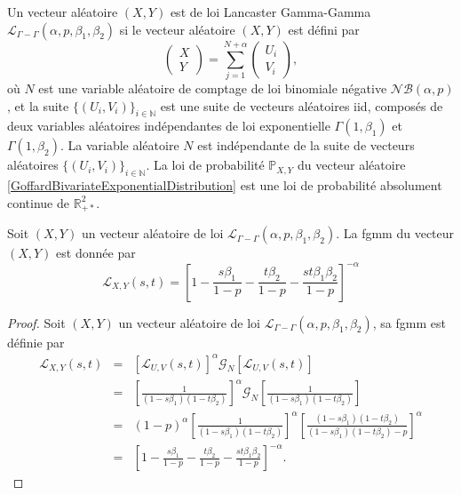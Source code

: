\begin{Def}\label{GoffardBivariateExponentialDistributionDef}
Un vecteur aléatoire $(X,Y)$ est de loi Lancaster Gamma-Gamma $\mathcal{L}_{\Gamma-\Gamma}(\alpha,p,\beta_{1},\beta_{2})$ si le vecteur aléatoire $(X,Y)$ est défini par
\begin{equation}\label{GoffardBivariateExponentialDistribution}
\left( \begin{array}{l}
X \\
Y\end{array}
\right)  =
 \displaystyle
\sum_{j=1}^{N+\alpha}
\left( \begin{array}{l}
U_{i} \\
V_{i}
\end{array}
\right),
\end{equation}
où $N$ est une variable aléatoire de comptage de loi binomiale négative $\mathcal{NB}(\alpha,p)$, et la suite $\{(U_{i},V_{i})\}_{i\in\mathbb{N}}$ est une suite de vecteurs aléatoires \gls{iid}, composés de deux variables aléatoires indépendantes de loi exponentielle $\Gamma(1,\beta_{1})$ et $\Gamma(1,\beta_{2})$. La variable aléatoire $N$ est indépendante de la suite de vecteurs aléatoires $\{(U_{i},V_{i})\}_{i\in\mathbb{N}}$. La loi de probabilité $\mathbb{P}_{X,Y}$ du vecteur aléatoire \eqref{GoffardBivariateExponentialDistribution} est une loi de probabilité absolument continue de $\mathbb{R}_{+*}^{2}$.
\end{Def}
\begin{Prop}\label{GoffardBivariateExponentialDistributionFgmmProp}
Soit $(X,Y)$ un vecteur aléatoire de loi $\mathcal{L}_{\Gamma-\Gamma}(\alpha,p,\beta_{1},\beta_{2})$. La \gls{fgmm} du vecteur $(X,Y)$ est donnée par 
\begin{equation}\label{GoffardBivariateExponentialDistributionFgmm}
\mathcal{L}_{X,Y}(s,t)=\left[1-\frac{s\beta_{1}}{1-p}-\frac{t\beta_{2}}{1-p}-\frac{st\beta_{1}\beta_{2}}{1-p}\right]^{-\alpha}
\end{equation}
\end{Prop}
\begin{proof}
Soit $(X,Y)$ un vecteur aléatoire de loi $\mathcal{L}_{\Gamma-\Gamma}(\alpha,p,\beta_{1},\beta_{2})$, sa \gls{fgmm} est définie par
\begin{eqnarray*}
\mathcal{L}_{X,Y}(s,t)&=&\left[\mathcal{L}_{U,V}(s,t)\right]^{\alpha}\mathcal{G}_{N}\left[\mathcal{L}_{U,V}(s,t)\right]\nonumber\\
&=&\left[\frac{1}{(1-s\beta_{1})(1-t\beta_{2})}\right]^{\alpha}\mathcal{G}_{N}\left[\frac{1}{(1-s\beta_{1})(1-t\beta_{2})}\right] \\
&=&(1-p)^{\alpha}\left[\frac{1}{(1-s\beta_{1})(1-t\beta_{2})}\right]^{\alpha}\left[\frac{(1-s\beta_{1})(1-t\beta_{2})}{(1-s\beta_{1})(1-t\beta_{2})-p}\right]^{\alpha}\\
&=&\left[1-\frac{s\beta_{1}}{1-p}-\frac{t\beta_{2}}{1-p}-\frac{st\beta_{1}\beta_{2}}{1-p}\right]^{-\alpha}.
\end{eqnarray*}
\end{proof}
